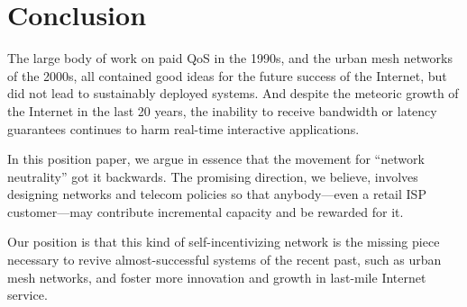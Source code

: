 \section{Conclusion}
The large body of work on paid QoS in the 1990s, and the urban mesh
networks of the 2000s, all contained good ideas for the future success
of the Internet, but did not lead to sustainably deployed systems. And
despite the meteoric growth of the Internet in the last 20 years, the
inability to receive bandwidth or latency guarantees continues to harm
real-time interactive applications.

In this position paper, we argue in essence that the movement for
``network neutrality'' got it backwards. The promising direction, we
believe, involves designing networks and telecom policies so that
anybody---even a retail ISP customer---may contribute incremental
capacity and be rewarded for it.

Our position is that this kind of self-incentivizing network is the
missing piece necessary to revive almost-successful systems of the
recent past, such as urban mesh networks, and foster more innovation
and growth in last-mile Internet service.

\label{sec:conc}
